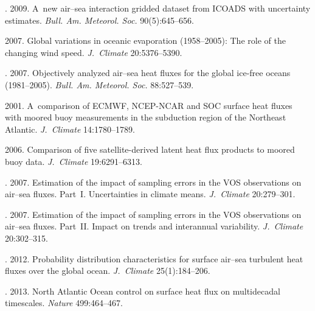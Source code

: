   \begin{multicols}{2}

\renewcommand{\bibname}{\protect\rmfamily References}

{\small\frenchspacing
 {%
 \begin{thebibliography}{99}
. 2009. A~new air--sea interaction gridded
dataset from ICOADS with uncertainty estimates. \textit{Bull.
Am. Meteorol. Soc.}  90(5):645--656.

 2007. Global variations in oceanic evaporation (1958--2005):
The role of the changing wind speed. \textit{J.~Climate}
20:5376--5390.

. 2007. Objectively analyzed air--sea heat
fluxes for the global ice-free oceans (1981--2005). \textit{Bull.
Am. Meteorol. Soc.} 88:527--539.

 2001. A~comparison of ECMWF, NCEP-NCAR and
SOC surface heat fluxes with moored buoy measurements in the subduction
region of the Northeast Atlantic. \textit{J.~Climate} 14:1780--1789.

 2006. Comparison of five satellite-derived latent heat flux
products to moored buoy data. \textit{J.~Climate} 19:6291--6313.

. 2007. Estimation of the impact of
sampling errors in the VOS observations on air--sea fluxes. Part~I.
Uncertainties in climate means. \textit{J.~Climate} 20:279--301.

. 2007. Estimation of the impact of
sampling errors in the VOS observations on air--sea fluxes. Part~II. Impact
on trends and interannual variability. \textit{J.~Climate} 20:302--315.

. 2012. Probability distribution
characteristics for surface air--sea turbulent heat fluxes over the global
ocean. \textit{J.~Climate} 25(1):184--206.

. 2013. North Atlantic Ocean control on surface heat flux
on multidecadal timescales. \textit{Nature} 499:464--467.


\end{thebibliography}}}
\end{multicols}
